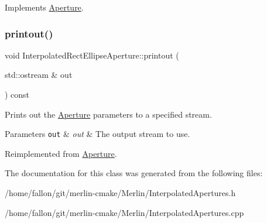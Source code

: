 Implements \hyperlink{classAperture_a77854d058bf8a00cfeb7a6d766dc0028}{Aperture}.

\mbox{\label{classInterpolatedRectEllipseAperture_abd88d2108988e8653517e3291dd92ff2}} 
\subsubsection{\texorpdfstring{printout()}{printout()}}
{\footnotesize\ttfamily void Interpolated\+Rect\+Ellipse\+Aperture\+::printout (\begin{DoxyParamCaption}\item[{std\+::ostream \&}]{out }\end{DoxyParamCaption}) const\hspace{0.3cm}{\ttfamily [virtual]}}

Prints out the \hyperlink{classAperture}{Aperture} parameters to a specified stream. 
\begin{DoxyParams}[1]{Parameters}
\mbox{\tt out}  & {\em out} & The output stream to use. \\
\hline
\end{DoxyParams}


Reimplemented from \hyperlink{classAperture_aff2f276b93bb2cb94e559e1c4901e38e}{Aperture}.



The documentation for this class was generated from the following files\+:\begin{DoxyCompactItemize}
\item 
/home/fallon/git/merlin-\/cmake/\+Merlin/Interpolated\+Apertures.\+h\item 
/home/fallon/git/merlin-\/cmake/\+Merlin/Interpolated\+Apertures.\+cpp\end{DoxyCompactItemize}
